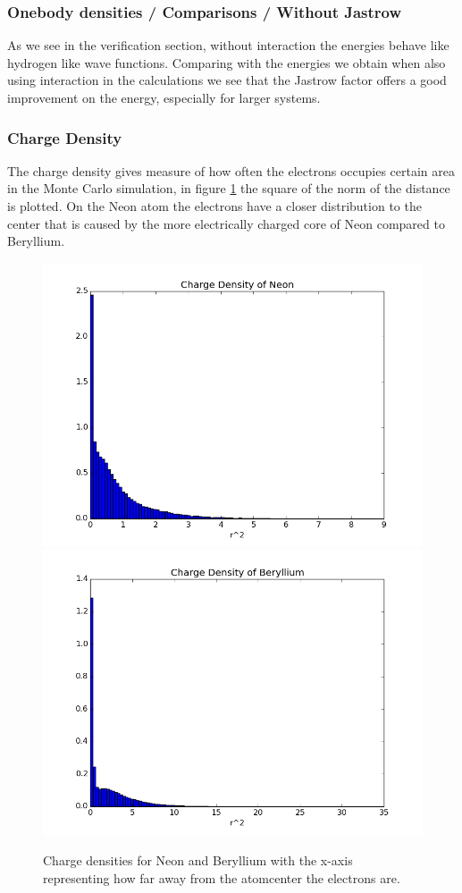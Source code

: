 \documentclass[x11names]{article}
\begin{document}
		\subsubsection{Onebody densities / Comparisons / Without Jastrow}
			As we see in the verification section, without interaction the energies behave like hydrogen like wave functions. Comparing with the energies we obtain when also using interaction in the calculations we see that the Jastrow factor offers a good improvement on the energy, especially for larger systems.

		\subsubsection{Charge Density}
			The charge density gives measure of how often the electrons occupies certain area in the Monte Carlo simulation, in figure \ref{fig:charge_density} the square of the norm of the distance is plotted.
			On the Neon atom the electrons have a closer distribution to the center that is caused by the more electrically charged core of Neon compared to Beryllium.

			\begin{figure}
				\centering \includegraphics[width=0.45\linewidth]{../figures/ChargeDensityNeon}
				\centering \includegraphics[width=0.45\linewidth]{../figures/ChargeDensityBeryllium}
				\protect\caption{Charge densities for Neon and Beryllium with the x-axis representing how far away from the atomcenter the electrons are. }
				\label{fig:charge_density}
			\end{figure}
\end{document}
